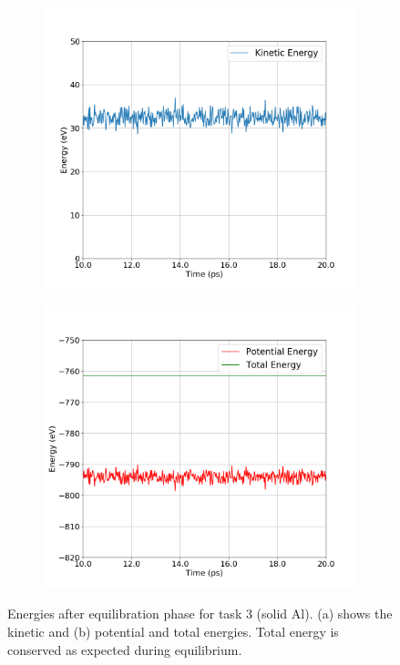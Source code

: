 \begin{figure}[!htbp]
	\begin{subfigure}[b]{0.5\textwidth}
		\includegraphics[width=\textwidth]{figs/task4-k-eq.png} 
		\caption{}
	\end{subfigure}%
	\begin{subfigure}[b]{0.5\textwidth}
		\includegraphics[width=\textwidth]{figs/task4-e-p-eq.png} 
		\caption{}
	\end{subfigure}
	\caption{Energies after equilibration phase for task 3 (solid Al). (a) shows the kinetic and (b) potential and total energies. Total energy is conserved as expected during equilibrium.}
	\label{fig4-5}
\end{figure}


